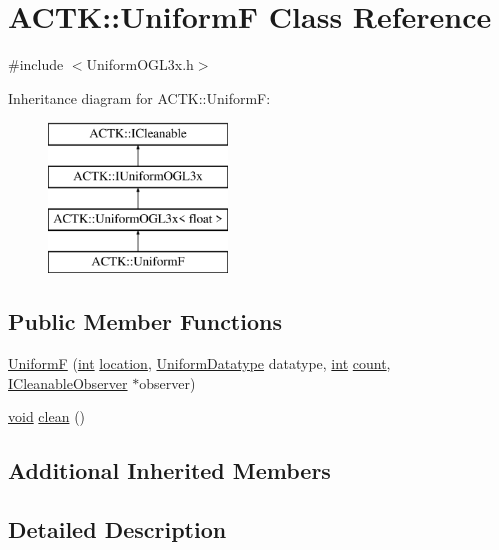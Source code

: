 \hypertarget{class_a_c_t_k_1_1_uniform_f}{\section{A\-C\-T\-K\-:\-:Uniform\-F Class Reference}
\label{class_a_c_t_k_1_1_uniform_f}
}


{\ttfamily \#include $<$Uniform\-O\-G\-L3x.\-h$>$}

Inheritance diagram for A\-C\-T\-K\-:\-:Uniform\-F\-:\begin{figure}[H]
\begin{center}
\leavevmode
\includegraphics[height=4.000000cm]{class_a_c_t_k_1_1_uniform_f}
\end{center}
\end{figure}
\subsection*{Public Member Functions}
\begin{DoxyCompactItemize}
\item 
\hyperlink{class_a_c_t_k_1_1_uniform_f_a9b437089d757fd18d6acc30a21eff120}{Uniform\-F} (\hyperlink{wglew_8h_a500a82aecba06f4550f6849b8099ca21}{int} \hyperlink{glew_8h_a050778a7129cc14e57da7024beb87ce8}{location}, \hyperlink{namespace_a_c_t_k_a0206df759d1628359ad73c2acea69d0e}{Uniform\-Datatype} datatype, \hyperlink{wglew_8h_a500a82aecba06f4550f6849b8099ca21}{int} \hyperlink{glew_8h_a10b284d589000663becfbc6867a3a9f7}{count}, \hyperlink{class_a_c_t_k_1_1_i_cleanable_observer}{I\-Cleanable\-Observer} $\ast$observer)
\item 
\hyperlink{wglew_8h_aeea6e3dfae3acf232096f57d2d57f084}{void} \hyperlink{class_a_c_t_k_1_1_uniform_f_a83127f30ecf00aabb1c26187a12f8c06}{clean} ()
\end{DoxyCompactItemize}
\subsection*{Additional Inherited Members}


\subsection{Detailed Description}


